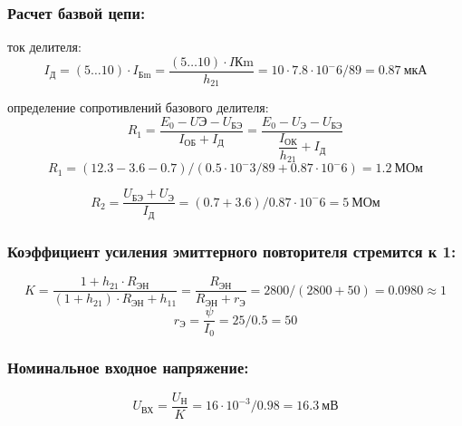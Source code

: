  \subsubsection{Расчет базвой цепи:}
ток делителя:
 \begin{equation}
   \label{eq:equation6_16}
 I_{\text{Д}}=(5 \ldots 10) \cdot I_{\text{Бm}}=\dfrac{(5 \ldots 10) \cdot I{\text{Кm}}}{h_21}=10 \cdot 7.8\cdot 10^-6 /89=0.87~\text{мкА}
 \end{equation}

 определение сопротивлений базового делителя:
 \begin{equation}
   \label{eq:equation6_17}
   R_1=\dfrac{E_0-U{\text{Э}}-U_{\text{БЭ}}}{I_{\text{ОБ}}+I_{\text{Д}}}=\dfrac{E_0-U_{\text{Э}}-U_{\text{БЭ}}}{ \dfrac{I_{\text{ОК}}}{ h_{21}}+I_{\text{Д}} }
   \end{equation}
   \begin{equation*}
   R_1=(12.3-3.6-0.7)/(0.5 \cdot 10^-3/89+0.87 \cdot 10^-6)=1.2~\text{МОм}
   \end{equation*}

 \begin{equation}
   \label{eq:equation6_18}
   R_2=\dfrac{U_{\text{БЭ}}+U_{\text{Э}}}{I_{\text{Д}}}=(0.7+3.6)/0.87 \cdot 10^-6=5~\text{МОм}
 \end{equation}
\subsubsection{Коэффициент усиления эмиттерного повторителя стремится к 1:}
\begin{equation}
   \label{eq:equation6_19}
K=\dfrac{1+h_21 \cdot R_{\text{ЭН}}}{(1+h_21)\cdot R_{\text{ЭН}}+h_11}=\dfrac{R_{\text{ЭН}}}{R_{\text{ЭН}}+{r_{\text{Э}}}}=2800/(2800+50)=0.0980 \approx 1
\end{equation}
\begin{equation}
   \label{eq:equation6_20}
   r_{\text{Э}}=\dfrac{\psi}{I_0}=25/0.5=50
\end{equation}
\subsubsection{Номинальное входное напряжение:}
\begin{equation}
   \label{eq:equation6_21}
U_{\text{ВХ}}=\dfrac {U_{\text{Н}}}{K}=16 \cdot 10^{-3} /0.98= 16.3~\text {мВ}
\end{equation}
